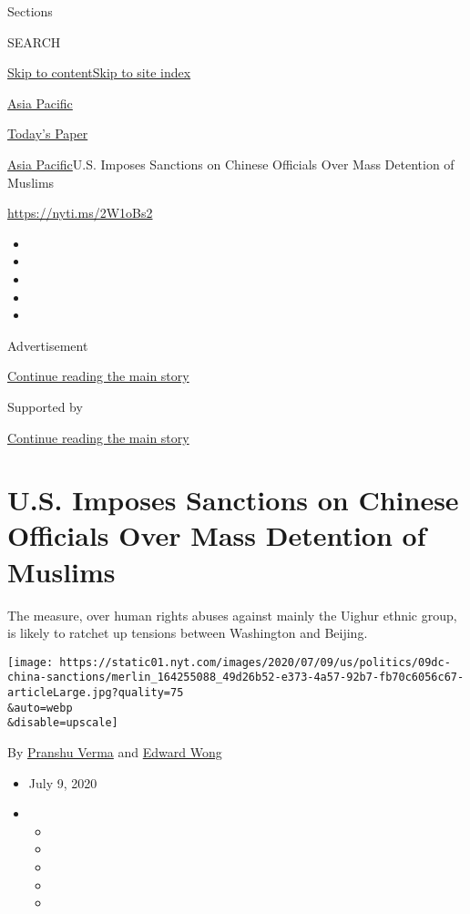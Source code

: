 Sections

SEARCH

\protect\hyperlink{site-content}{Skip to
content}\protect\hyperlink{site-index}{Skip to site index}

\href{https://www.nytimes.com/section/world/asia}{Asia Pacific}

\href{https://myaccount.nytimes.com/auth/login?response_type=cookie\&client_id=vi}{}

\href{https://www.nytimes.com/section/todayspaper}{Today's Paper}

\href{/section/world/asia}{Asia Pacific}\textbar{}U.S. Imposes Sanctions
on Chinese Officials Over Mass Detention of Muslims

\url{https://nyti.ms/2W1oBs2}

\begin{itemize}
\item
\item
\item
\item
\item
\end{itemize}

Advertisement

\protect\hyperlink{after-top}{Continue reading the main story}

Supported by

\protect\hyperlink{after-sponsor}{Continue reading the main story}

\hypertarget{us-imposes-sanctions-on-chinese-officials-over-mass-detention-of-muslims}{%
\section{U.S. Imposes Sanctions on Chinese Officials Over Mass Detention
of
Muslims}\label{us-imposes-sanctions-on-chinese-officials-over-mass-detention-of-muslims}}

The measure, over human rights abuses against mainly the Uighur ethnic
group, is likely to ratchet up tensions between Washington and Beijing.

\texttt{[image: https://static01.nyt.com/images/2020/07/09/us/politics/09dc-china-sanctions/merlin\_164255088\_49d26b52-e373-4a57-92b7-fb70c6056c67-articleLarge.jpg?quality=75\\\&auto=webp\\\&disable=upscale]}

By \href{https://www.nytimes.com/by/pranshu-verma}{Pranshu Verma} and
\href{https://www.nytimes.com/by/edward-wong}{Edward Wong}

\begin{itemize}
\item
  July 9, 2020
\item
  \begin{itemize}
  \item
  \item
  \item
  \item
  \item
  \end{itemize}
\end{itemize}

